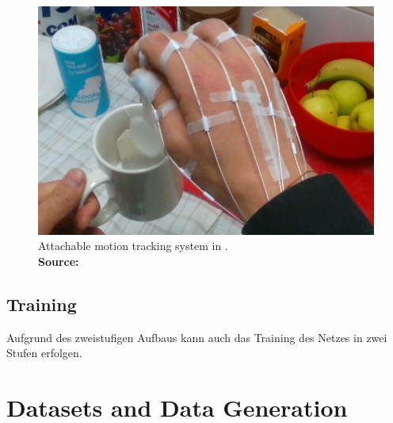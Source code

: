 \begin{figure}
	\centering
	\includegraphics[width=0.7\linewidth]{Ressourcen/garcia-rgb-problem}
	\caption[Attachable motion tracking system]{Attachable motion tracking system in \cite{GarciaHernando2017}. \\ \textbf{Source:} \cite{GarciaHernando2017}}
	\label{fig:garcia-rgb-problem}
\end{figure}

\begin{figure}
	\centering
	
	\caption{}
	\label{fig:software-net-structure-blackbox}
\end{figure}

\subsection{Training}
	Aufgrund des zweistufigen Aufbaus kann auch das Training des Netzes in zwei Stufen erfolgen.



\section{Datasets and Data Generation}
